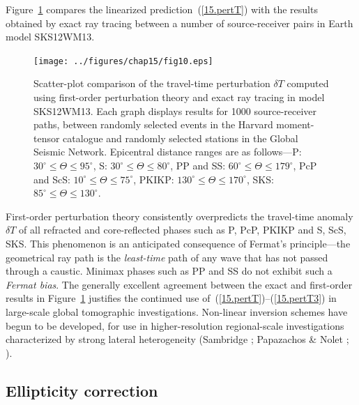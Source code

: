 Figure~\ref{15.fig.LTfig10rhs} compares the linearized
prediction~(\ref{15.pertT}) with the results obtained by exact ray
tracing between a number of source-receiver pairs in Earth
model SKS12WM13.
\begin{figure}[!b]
\begin{center}
\texttt{[image: ../figures/chap15/fig10.eps]}
\end{center}
\caption[travel time scatter plot]
{\label{15.fig.LTfig10rhs}
Scatter-plot comparison of the travel-time perturbation
$\delta T$ computed using first-order perturbation theory
and exact ray tracing in model SKS12WM13.  Each graph
displays results for 1000 source-receiver paths, between
randomly selected events in the Harvard moment-tensor
catalogue and randomly selected stations in the Global
Seismic Network.  Epicentral distance ranges are as
follows---P: $30^{\circ}\leq\Theta\leq 95^{\circ}$,
S: $30^{\circ}\leq\Theta\leq 80^{\circ}$, PP and SS:
$60^{\circ}\leq\Theta\leq 179^{\circ}$, PcP and ScS:
$10^{\circ}\leq\Theta\leq 75^{\circ}$, PKIKP:
$130^{\circ}\leq\Theta\leq 170^{\circ}$, SKS:
$85^{\circ}\leq\Theta\leq 130^{\circ}$.
}
\end{figure}
First-order perturbation theory consistently overpredicts
the travel-time anomaly $\delta T$ of all refracted and core-reflected
phases such as P, PcP, PKIKP and S, ScS, SKS.  This phenomenon is
an anticipated consequence of Fermat's principle---the geometrical
ray path is the {\em least-time\/} path of any wave that has not
%
passed through a caustic.  Minimax phases such as PP and SS do not
%
exhibit such a {\em Fermat bias\/}.  The generally excellent
%
agreement between the exact and first-order results in
Figure~\ref{15.fig.LTfig10rhs} justifies the continued
use of~(\ref{15.pertT})--(\ref{15.pertT3}) in large-scale global tomographic
investigations.  Non-linear inversion schemes have begun to be developed,
for use in higher-resolution regional-scale investigations
characterized by strong lateral heterogeneity (Sambridge
\citeyear{sambridge90}; Papazachos \& Nolet
\citeyear{papazachos&nolet97a}; \citeyear{papazachos&nolet97b}).

\renewcommand{\thesubsection}{$\!\!\!\raise1.3ex\hbox{$\star$}\!\!$
\arabic{chapter}.\arabic{section}.\arabic{subsection}}
\subsection{Ellipticity correction}
%
\renewcommand{\thesubsection}{\arabic{chapter}.\arabic{section}.\arabic{subsection}}


